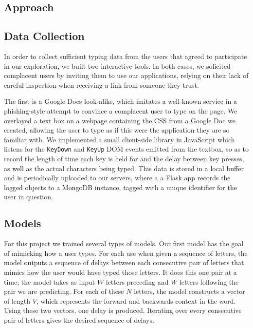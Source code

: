 \documentclass{amsart}
\begin{document}
\begin{multicols*}{2}
\section{Approach}
\subsection{Data Collection}

In order to collect sufficient typing data from the users that agreed to participate in our exploration, we built two interactive tools. In both cases, we solicited complacent users by inviting them to use our applications, relying on their lack of careful inspection when receiving a link from someone they trust.

The first is a Google Docs look-alike, which imitates a well-known service in a phishing-style attempt to convince a complacent user to type on the page. We overlayed a text box on a webpage containing the CSS from a Google Doc we created, allowing the user to type as if this were the application they are so familiar with. We implemented a small client-side library in JavaScript which listens for the \texttt{KeyDown} and \texttt{KeyUp} DOM events emitted from the textbox, so as to record the length of time each key is held for and the delay between key presses, as well as the actual characters being typed. This data is stored in a local buffer and is periodically uploaded to our servers, where a a Flask app records the logged objects to a MongoDB instance, tagged with a unique identifier for the user in question.



\subsection{Models}
For this project we trained several types of models. Our first model has the goal of mimicking how a user types. For each use when given a sequence of letters, the model outputs a sequence of delays between each consecutive pair of letters that mimics how the user would have typed those letters. It does this one pair at a time; the model takes as input $W$ letters preceding and $W$ letters following the pair we are predicting. For each of these $N$ letters, the model constructs a vector of length $V$, which represents the forward and backwards context in the word. Using these two vectors, one delay is produced. Iterating over every consecutive pair of letters gives the desired sequence of delays.




\end{multicols*}
\end{document}
